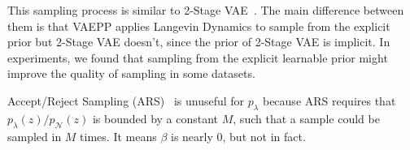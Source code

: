 This sampling process is similar to 2-Stage VAE~\cite{dai2019diagnosing}. The main difference between them is that VAEPP applies Langevin Dynamics to sample from the explicit prior but 2-Stage VAE doesn't, since the prior of 2-Stage VAE is implicit. In experiments, we found that sampling from the explicit learnable prior might improve the quality of sampling in some datasets. 

Accept/Reject Sampling (ARS)~\cite{bauer2019resampled} is unuseful for $p_\lambda$ because ARS requires that $p_\lambda(z) / p_\mathcal{N}(z)$ is bounded by a constant $M$, such that a sample could be sampled in $M$ times. It means $\beta$ is nearly 0, but not in fact.
 
 